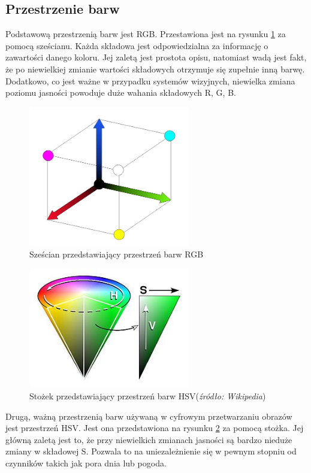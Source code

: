 
\subsection{Przestrzenie barw}

Podstawową przestrzenią barw jest RGB. 
Przestawiona jest na rysunku \ref{fig:rgb} za pomocą sześcianu. 
Każda składowa jest odpowiedzialna za informację o zawartości danego koloru. 
Jej zaletą jest prostota opisu, natomiast wadą jest fakt, że po niewielkiej zmianie wartości składowych otrzymuje się zupełnie inną barwę. 
Dodatkowo, co jest ważne w przypadku systemów wizyjnych, niewielka zmiana poziomu jasności powoduje duże wahania składowych R, G, B.

\begin{figure}
  \centering
  \includegraphics[width=7cm]{img/rgb.jpg}
  \caption{Sześcian przedstawiający przestrzeń barw RGB\cite{W4}}
  \label{fig:rgb}
\end{figure}


\begin{figure}
  \centering
  \includegraphics[width=7cm]{img/hsv.jpg}
  \caption{Stożek przedstawiający przestrzeń barw HSV(\textit{źródło: Wikipedia})}
  \label{fig:hsv}
\end{figure}

Drugą, ważną przestrzenią barw używaną w cyfrowym przetwarzaniu obrazów jest przestrzeń HSV. 
Jest ona przedstawiona na rysunku \ref{fig:hsv} za pomocą stożka. 
Jej główną zaletą jest to, że przy niewielkich zmianach jasności są bardzo nieduże zmiany w składowej S. %
Pozwala to na uniezależnienie się w pewnym stopniu od czynników takich jak pora dnia lub pogoda.

